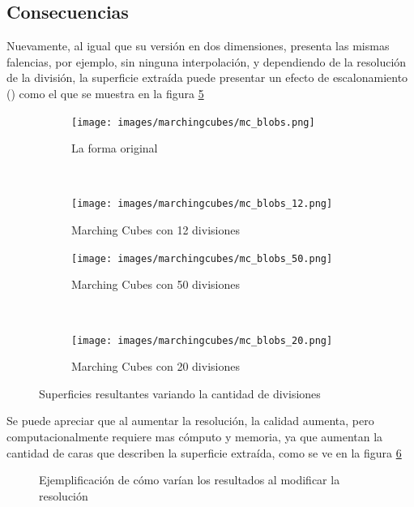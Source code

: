 \subsection{Consecuencias}
\label{subsec:marchingCubes:consecuencias}

Nuevamente, al igual que su versión en dos dimensiones, presenta las mismas falencias,
por ejemplo, sin ninguna interpolación, y dependiendo de la resolución de la división, la
superficie extraída puede presentar un efecto de escalonamiento () como el que se
muestra en la figura \ref{f:estadoDelArte;superficies_resultantes_variando_divisiones}

\begin{figure}

	\begin{subfigure}{0.45\textwidth}
		\centering
		\texttt{[image: images/marchingcubes/mc\_blobs.png]}
		\caption{La forma original}
		\label{f:estadoDelArte:mc_blobs}
	\end{subfigure}
	~
	\begin{subfigure}{0.45\textwidth}
		\centering
		\texttt{[image: images/marchingcubes/mc\_blobs\_12.png]}
		\caption{Marching Cubes con 12 divisiones}
		\label{f:estadoDelArte:mc_blobs_12}
	\end{subfigure}

	\begin{subfigure}{0.45\textwidth}
		\centering
		\texttt{[image: images/marchingcubes/mc\_blobs\_50.png]}
		\caption{Marching Cubes con 50 divisiones}
		\label{f:estadoDelArte:mc_blobs_50}
	\end{subfigure}
	~
	\begin{subfigure}{0.45\textwidth}
		\centering
		\texttt{[image: images/marchingcubes/mc\_blobs\_20.png]}
		\caption{Marching Cubes con 20 divisiones}
		\label{f:estadoDelArte:mc_blobs_20}
	\end{subfigure}

	\caption{Superficies resultantes variando la cantidad de divisiones}
	\label{f:estadoDelArte;superficies_resultantes_variando_divisiones}
\end{figure}

Se puede apreciar que al aumentar la resolución, la calidad aumenta, pero
computacionalmente requiere mas cómputo y memoria, ya que aumentan la cantidad de caras que
describen la superficie extraída, como se ve en la figura \ref{f:estadoDelArte:polygonise3}

\begin{figure}[hbp]
\centering
\caption{Ejemplificación de cómo varían los resultados al modificar la resolución}
\label{f:estadoDelArte:polygonise3}
\end{figure}

